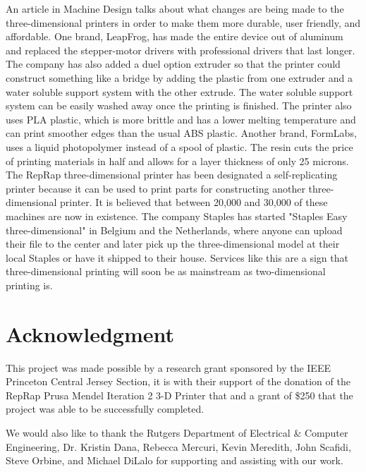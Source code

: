 \documentclass[pdftex,10.5pt]{report}
\begin{document}
An article in Machine Design talks about what changes are being made to the three-dimensional printers in order to make them more durable, user friendly, and affordable. One brand, LeapFrog, has made the entire device out of aluminum and  replaced the stepper-motor drivers with professional drivers that last longer. The company has also added a duel option extruder so that the printer could construct something like a bridge by adding the plastic from one extruder and a water soluble support system with the other extrude. The water soluble support system can be easily washed away once the printing is finished. The printer also uses PLA plastic, which is more brittle and has a lower melting temperature and can print smoother edges than the usual ABS plastic. Another brand, FormLabs, uses a liquid photopolymer instead of a spool of plastic. The resin cuts the price of printing materials in half and allows for a layer thickness of only 25 microns. The RepRap three-dimensional printer has been designated a self-replicating printer because it can be used to print parts for constructing another three-dimensional printer. It is believed that between 20,000 and 30,000 of these machines are now in existence.\cite{cite7} The company Staples has started "Staples Easy three-dimensional" in Belgium and the Netherlands, where anyone can upload their file to the center and later pick up the three-dimensional model at their local Staples or have it shipped to their house. Services like this are a sign that three-dimensional printing will soon be as mainstream as two-dimensional printing is.

\section{Acknowledgment}
This project was made possible by a research grant sponsored by the IEEE Princeton Central Jersey Section, it is with their support of the donation of the RepRap Prusa Mendel Iteration 2 3-D Printer that and a grant of \$250 that the project was able to be successfully completed.

We would also like to thank the Rutgers Department of Electrical \& Computer Engineering, Dr. Kristin Dana, Rebecca Mercuri, Kevin Meredith, John Scafidi, Steve Orbine, and Michael DiLalo for supporting and assisting with our work. 
\end{document}
